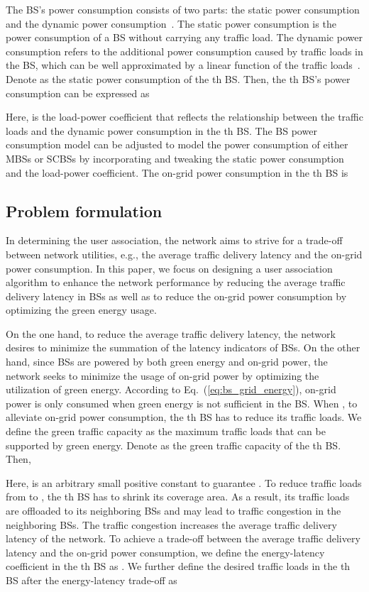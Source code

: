 \documentclass[journal]{IEEEtran}
\theoremstyle{definition}
\begin{document}
The BS's power consumption consists of two parts: the static power consumption and the dynamic power consumption~\cite{Auer:2011:HME}. The static power consumption is the power consumption of a BS without carrying any traffic load. The dynamic power consumption refers to the additional power consumption caused by traffic loads in the BS, which can be well approximated by a linear function of the traffic loads~\cite{Auer:2011:HME}. Denote  as the static power consumption of the th BS. Then, the th BS's power consumption can be expressed as

Here,  is the load-power coefficient that reflects the relationship between the traffic loads and the dynamic power consumption in the th BS. The BS power consumption model can be adjusted to model the power consumption of either MBSs or SCBSs by incorporating and tweaking the static power consumption and the load-power
coefficient. The on-grid power consumption in the th BS is


\subsection{Problem formulation}
In determining the user association, the network aims to strive for a trade-off between network utilities, e.g., the average traffic delivery latency and the on-grid power consumption. In this paper, we focus on designing a user association algorithm to enhance the network performance by reducing the average traffic delivery latency in BSs as well as to reduce the on-grid power consumption by optimizing the green energy usage.

On the one hand, to reduce the average traffic delivery latency, the network desires to minimize the summation of the latency indicators of BSs. On the other hand, since BSs are powered by both green energy and on-grid power, the network seeks to minimize the usage of on-grid power by optimizing the utilization of green energy.
According to Eq.~(\ref{eq:bs_grid_energy}), on-grid power is only consumed when green energy is not sufficient in the BS. When , to alleviate on-grid power consumption, the th BS has to reduce its traffic loads. We define the green traffic capacity as the maximum traffic loads that can be supported by green energy. Denote  as the green traffic capacity of the th BS. Then,

Here,  is an arbitrary small positive constant to guarantee .
To reduce traffic loads from  to , the th BS has to shrink its coverage area. As a result, its traffic loads are offloaded to its neighboring BSs and may lead to traffic congestion in the neighboring BSs. The traffic congestion increases the average traffic delivery latency of the network. To achieve a trade-off between the average traffic delivery latency and the on-grid power consumption, we define the energy-latency coefficient in the th BS as . We further define the desired traffic loads in the th BS after the energy-latency trade-off as
\end{document}
